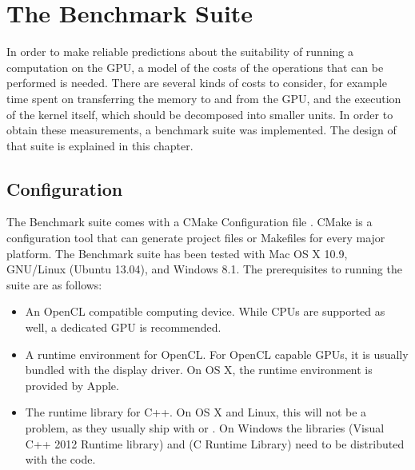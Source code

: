 
\chapter{The Benchmark Suite}
\label{chap:suite}
In order to make reliable predictions about the suitability of running a computation on the GPU, a model of the costs of the operations that can be performed is needed. There are several kinds of costs to consider, for example time spent on transferring the memory to and from the GPU, and the execution of the kernel itself, which should be decomposed into smaller units. In order to obtain these measurements, a benchmark suite was implemented. The design of that suite is explained in this chapter.

\section{Configuration}
\label{sect:suite_configuration}
The Benchmark suite comes with a CMake Configuration file . CMake is a configuration tool that can generate project files or Makefiles for every major platform. The Benchmark suite has been tested with Mac OS X 10.9, GNU/Linux (Ubuntu 13.04), and Windows 8.1.
The prerequisites to running the suite are as follows:
\begin{itemize}
	\item An OpenCL compatible computing device. While CPUs are supported as well, a dedicated GPU is recommended.
	\item A runtime environment for OpenCL. For OpenCL capable GPUs, it is usually bundled with the display driver. On OS X, the runtime environment is provided by Apple.
	\item The runtime library for C++. On OS X and Linux, this will not be a problem, as they usually ship with  or . On Windows the libraries  (Visual C++ 2012 Runtime library) and  (C Runtime Library) need to be distributed with the code.
\end{itemize}

